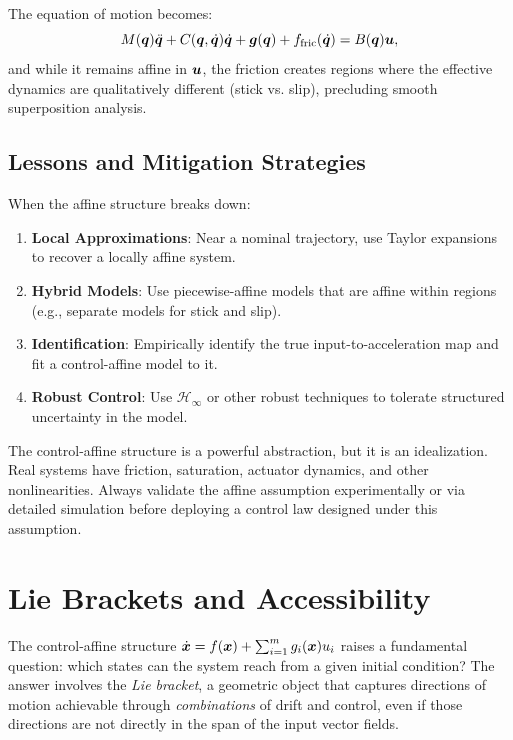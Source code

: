 The equation of motion becomes:
\begin{equation}
M(\bm{q})\ddot{\bm{q}} + C(\bm{q},\dot{\bm{q}})\dot{\bm{q}} + \bm{g}(\bm{q}) + f_{\text{fric}}(\dot{\bm{q}}) = B(\bm{q})\bm{u},
\label{eq:ch3:with-friction}
\end{equation}
and while it remains affine in $\bm{u}$, the friction creates regions where the effective
dynamics are qualitatively different (stick vs. slip), precluding smooth superposition analysis.

\subsection{Lessons and Mitigation Strategies}

When the affine structure breaks down:

\begin{enumerate}
\item \textbf{Local Approximations}: Near a nominal trajectory, use Taylor expansions to
      recover a locally affine system.

\item \textbf{Hybrid Models}: Use piecewise-affine models that are affine within regions
      (e.g., separate models for stick and slip).

\item \textbf{Identification}: Empirically identify the true input-to-acceleration map
      and fit a control-affine model to it.

\item \textbf{Robust Control}: Use $\mathcal{H}_\infty$ or other robust techniques to
      tolerate structured uncertainty in the model.
\end{enumerate}

\begin{warningbox}
The control-affine structure is a powerful abstraction, but it is an idealization. Real
systems have friction, saturation, actuator dynamics, and other nonlinearities. Always
validate the affine assumption experimentally or via detailed simulation before deploying
a control law designed under this assumption.
\end{warningbox}



\section{Lie Brackets and Accessibility}

The control-affine structure $\dot{\bm{x}} = f(\bm{x}) + \sum_{i=1}^m g_i(\bm{x}) u_i$ raises a
fundamental question: which states can the system reach from a given initial condition?
The answer involves the \emph{Lie bracket}, a geometric object that captures directions
of motion achievable through \emph{combinations} of drift and control, even if those
directions are not directly in the span of the input vector fields.


